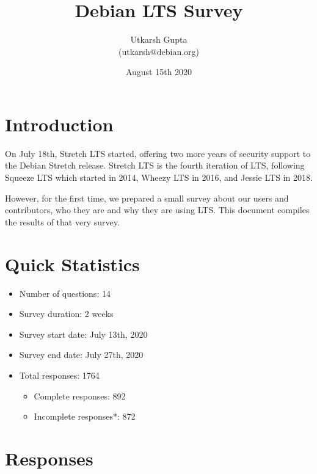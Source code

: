 \documentclass{article}
\title{\textbf{Debian LTS Survey}}
\author{Utkarsh Gupta \\
    \small (utkarsh@debian.org)}
\date{August 15th 2020}
\begin{document}
\maketitle

\vspace{5mm}
\section{Introduction}

On July 18th, Stretch LTS started, offering two more years of security support to the Debian Stretch release. Stretch LTS is the fourth iteration of LTS, following Squeeze LTS which started in 2014, Wheezy LTS in 2016, and Jessie LTS in 2018. \par

\vspace{3mm}
However, for the first time, we prepared a small survey about our users and contributors, who they are and why they are using LTS. This document compiles the results of that very survey.

\vspace{5mm}
\section{Quick Statistics}

\vspace{3mm}
\begin{itemize}
    \item Number of questions: 14
    \item Survey duration: 2 weeks
    \item Survey start date: July 13th, 2020
    \item Survey end date: July 27th, 2020
    \item Total responses: 1764
    \begin{itemize}
        \item Complete responses: 892
        \item Incomplete responses*: 872
    \end{itemize}
\end{itemize}


\vspace{3mm}
\section{Responses}
\end{document}
